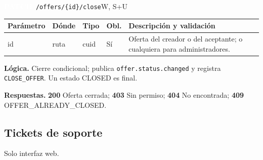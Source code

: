 \documentclass[11pt,a4paper]{report}
\newcommand{\verbo}[2]{\colorbox{#1}{\textcolor{white}{\ttfamily\bfseries\small #2}}}
\begin{document}
\begin{apiendpoint}{\verbo{verbpatch}{PATCH}\ \texttt{/\allowbreak{}offers/\allowbreak{}\{id\}/\allowbreak{}close}}{W, S+U}
\begin{tabularx}{\linewidth}{@{}>{\ttfamily\raggedright}p{3.0cm}p{1.35cm}p{1.9cm}p{0.9cm}X@{}}
\toprule \normalfont\bfseries Parámetro & \bfseries Dónde & \bfseries Tipo & \bfseries Obl. & \bfseries Descripción y validación\\ \midrule
id & ruta & cuid & Sí & Oferta del creador o del aceptante; o cualquiera para administradores.\\
\bottomrule\end{tabularx}
\par\smallskip\textbf{Lógica.} Cierre condicional; publica \texttt{offer.status.changed} y registra \texttt{CLOSE\_OFFER}. Un estado CLOSED es final.
\par\smallskip\textbf{Respuestas.} \textbf{200} Oferta cerrada; \textbf{403} Sin permiso; \textbf{404} No encontrada; \textbf{409} OFFER\_ALREADY\_CLOSED.
\end{apiendpoint}
\subsection{Tickets de soporte}
Solo interfaz web.
\end{document}
